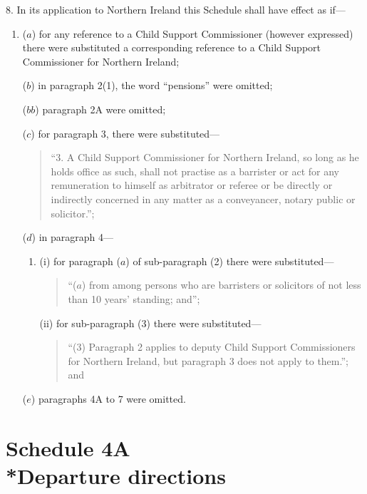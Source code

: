 \documentclass[12pt,a4paper]{article}
\begin{document}
8. In its application to Northern Ireland this Schedule shall have effect as if—
\begin{enumerate}\item[]
($a$) for any reference to a Child Support Commissioner (however expressed) there were substituted a corresponding reference to a Child Support Commissioner for Northern Ireland;

($b$) in paragraph 2(1), the word “pensions” were omitted;

($bb$) paragraph 2A were omitted;

($c$) for paragraph 3, there were substituted—
\begin{quotation}
“3. A Child Support Commissioner for Northern Ireland, so long as he holds office as such, shall not practise as a barrister or act for any remuneration to himself as arbitrator or referee or be directly or indirectly concerned in any matter as a conveyancer, notary public or solicitor.”;
\end{quotation}

($d$) in paragraph 4—
\begin{enumerate}\item[]
(i) for paragraph ($a$)  of sub-paragraph (2)  there were substituted—
\begin{quotation}
“($a$) from among persons who are barristers or solicitors of not less than 10 years' standing; and”;
\end{quotation}

(ii) for sub-paragraph (3)  there were substituted—
\begin{quotation}
“(3) Paragraph 2 applies to deputy Child Support Commissioners for Northern Ireland, but paragraph 3 does not apply to them.”; and
\end{quotation}
\end{enumerate}

($e$) 
paragraphs 4A  %
to 7 were omitted.
\end{enumerate}


\part[Schedule 4A --- Departure directions]{Schedule 4A\\*Departure directions}
\end{document}
